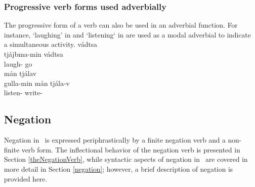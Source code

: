 \subsubsection{Progressive verb forms used adverbially}\label{ADVverbs}
The progressive form of a verb can also be used in an adverbial function. For instance,  ‘laughing’ in  and  ‘listening‘ in  are used as a modal adverbial to indicate a simultaneous activity. %
\ea\label{ADVverbsEx1}%
\glll	{} vádtsa\\
	tjájbma-min vádtsa\\
	laugh- go\BS{}\\\nopagebreak
{}	
\z
\ea\label{ADVverbsEx2}%
\glll	{} mån tjálav\\
	gulla-min mån tjála-v\\
	listen-  write-\\\nopagebreak
{}	
\z



\subsection{Negation}\label{negationVerb}
Negation in \PS\ is expressed periphrastically by a finite negation verb and a non-finite verb form. The inflectional behavior of the negation verb is presented in Section \ref{theNegationVerb}, while syntactic aspects of negation in \PS\ are covered in more detail in Section \ref{negation}; however, a brief description of negation is provided here. 

